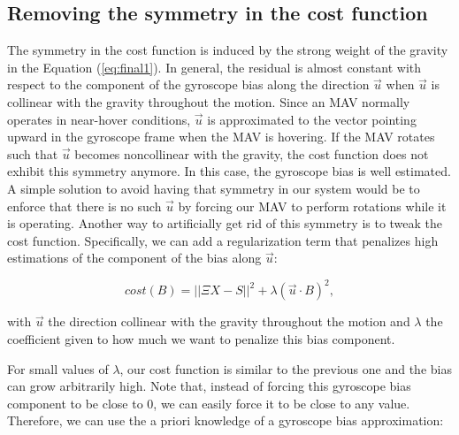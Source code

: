 \documentclass[letterpaper, 10 pt, conference]{ieeeconf}  %
\begin{document}
\subsection{Removing the symmetry in the cost function \label{sec:symmetry}}

The symmetry in the cost function is induced by the strong weight of the gravity in the Equation (\ref{eq:final1}).
In general, the residual is almost constant with respect to the component of the gyroscope bias along the direction $\vec{u}$ when $\vec{u}$ is collinear with the gravity throughout the motion.
Since an MAV normally operates in near-hover conditions, $\vec{u}$ is approximated to the vector pointing upward in the gyroscope frame when the MAV is hovering.
If the MAV rotates such that $\vec{u}$ becomes noncollinear with the gravity, the cost function does not exhibit this symmetry anymore.
In this case, the gyroscope bias is well estimated.
A simple solution to avoid having that symmetry in our system would be to enforce that there is no such $\vec{u}$ by forcing our MAV to perform rotations while it is operating.
Another way to artificially get rid of this symmetry is to tweak the cost function.
Specifically, we can add a regularization term that penalizes high estimations of the component of the bias along $\vec{u}$:

\begin{equation}
cost(B) = ||\Xi X - S||^2 + \lambda (\vec{u} \cdot B)^2,
\end{equation}


\noindent with $\vec{u}$ the direction collinear with the gravity throughout the motion and  $\lambda$ the coefficient given to how much we want to penalize this bias component.




For small values of $\lambda$, our cost function is similar to the previous one and the bias can grow arbitrarily high.
Note that, instead of forcing this gyroscope bias component to be close to $0$, we can easily force it to be close to any value.
Therefore, we can use the a priori knowledge of a gyroscope bias approximation:
\end{document}
